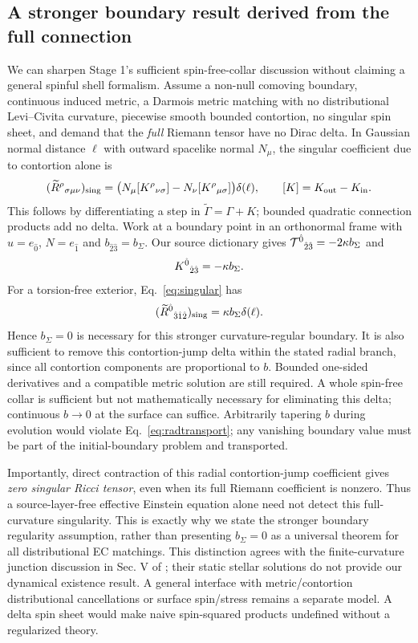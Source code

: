 \subsection{A stronger boundary result derived from the full connection}
We can sharpen Stage 1's sufficient spin-free-collar discussion without claiming a general spinful shell formalism. Assume a non-null comoving boundary, continuous induced metric, a Darmois metric matching with no distributional Levi--Civita curvature, piecewise smooth bounded contortion, no singular spin sheet, and demand that the \emph{full} Riemann tensor have no Dirac delta. In Gaussian normal distance $\ell$ with outward spacelike normal $N_\mu$, the singular coefficient due to contortion alone is
\begin{equation}
 (\widetilde R^\rho{}_{\sigma\mu\nu})_{\rm sing}
 =\big(N_\mu[K^\rho{}_{\nu\sigma}]-N_\nu[K^\rho{}_{\mu\sigma}]\big)\delta(\ell),
 \qquad [K]=K_{\rm out}-K_{\rm in}.\label{eq:singular}
\end{equation}
This follows by differentiating a step in $\widetilde\Gamma=\Gamma+K$; bounded quadratic connection products add no delta. Work at a boundary point in an orthonormal frame with $u=e_{\hat0}$, $N=e_{\hat1}$ and $b_{\hat2\hat3}=b_\Sigma$. Our source dictionary gives $\mathcal T^{\hat0}{}_{\hat2\hat3}=-2\kappa b_\Sigma$ and
\begin{equation}
 K^{\hat0}{}_{\hat2\hat3}=-\kappa b_\Sigma.
\end{equation}
For a torsion-free exterior, Eq.~\eqref{eq:singular} has
\begin{equation}
 (\widetilde R^{\hat0}{}_{\hat3\hat1\hat2})_{\rm sing}
 =\kappa b_\Sigma\delta(\ell).
\end{equation}
Hence $b_\Sigma=0$ is necessary for this stronger curvature-regular boundary. It is also sufficient to remove this contortion-jump delta within the stated radial branch, since all contortion components are proportional to $b$. Bounded one-sided derivatives and a compatible metric solution are still required. A whole spin-free collar is sufficient but not mathematically necessary for eliminating this delta; continuous $b\to0$ at the surface can suffice. Arbitrarily tapering $b$ during evolution would violate Eq.~\eqref{eq:radtransport}; any vanishing boundary value must be part of the initial-boundary problem and transported.

Importantly, direct contraction of this radial contortion-jump coefficient gives \emph{zero singular Ricci tensor}, even when its full Riemann coefficient is nonzero. Thus a source-layer-free effective Einstein equation alone need not detect this full-curvature singularity. This is exactly why we state the stronger boundary regularity assumption, rather than presenting $b_\Sigma=0$ as a universal theorem for all distributional EC matchings. This distinction agrees with the finite-curvature junction discussion in Sec. V of \cite{LC}; their static stellar solutions do not provide our dynamical existence result. A general interface with metric/contortion distributional cancellations or surface spin/stress remains a separate model. A delta spin sheet would make naive spin-squared products undefined without a regularized theory.

